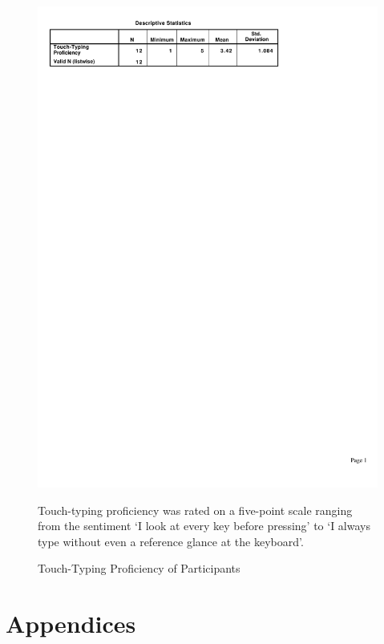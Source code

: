 \documentclass[a4paper, 12pt]{report}
\begin{document}
\begin{figure}[ht]
\centerline{\includegraphics{figures/TouchTyping.pdf}}
\caption{Touch-Typing Proficiency of Participants}
\label{fig:partic_ttype}
\medskip
\small
Touch-typing proficiency was rated on a five-point scale ranging from the sentiment `I look at every key before pressing' to `I always type without even a reference glance at the keyboard'.
\end{figure}


\pagebreak
\printglossary[title=Terms]

\pagebreak
\printbibliography

\pagebreak
\chapter{Appendices}
\end{document}
